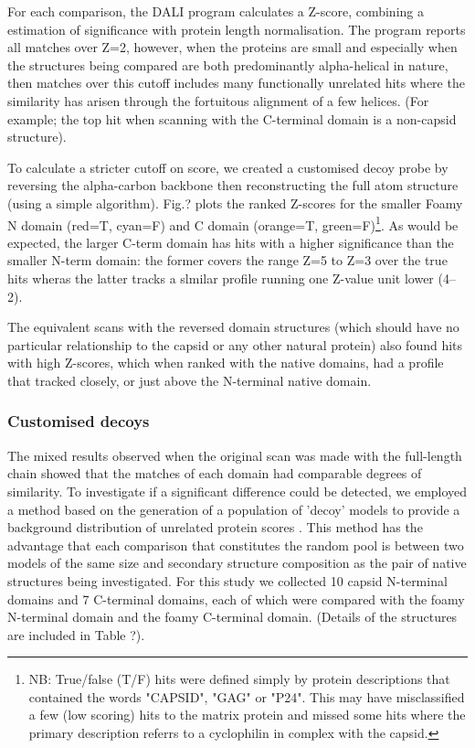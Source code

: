 For each comparison, the DALI program calculates a Z-score, combining a estimation of significance
with protein length normalisation.   The program reports all matches over Z=2, however, when the
proteins are small and especially when the structures being compared are both predominantly
alpha-helical in nature, then matches over this cutoff includes many functionally unrelated
hits where the similarity has arisen through the fortuitous alignment of a few helices.
(For example; the top hit when scanning with the C-terminal domain is a non-capsid structure).

To calculate a stricter cutoff on score, we created a customised decoy probe by reversing the
alpha-carbon backbone then reconstructing the full atom structure (using a simple algorithm).
Fig.? plots the ranked Z-scores for the smaller Foamy N domain (red=T, cyan=F) and C domain
(orange=T, green=F)\footnote{
NB: True/false (T/F) hits were defined simply by protein descriptions that contained the
words "CAPSID", "GAG" or "P24".   This may have misclassified a few (low scoring) hits to the matrix protein
and missed some hits where the primary description referrs to a cyclophilin in complex with the capsid. 
}.   As would be expected, the larger C-term domain has hits with a higher significance than the
smaller N-term domain:  the former covers the range Z=5 to Z=3 over the true hits wheras the
latter tracks a slmilar profile running one Z-value unit lower (4--2).

The equivalent scans with the reversed domain structures (which should have no particular
relationship to the capsid or any other natural protein) also found hits with high Z-scores,
which when ranked with the native domains, had a profile that tracked closely, or just above
the N-terminal native domain.
 

\subsubsection{Customised decoys}

The mixed results observed when the original scan was made with the full-length chain showed that
the matches of each domain had comparable degrees of similarity.    To investigate if a significant
difference could be detected, we employed a method based on the generation of a population of
'decoy' models to provide a background distribution of unrelated protein scores \cite{Taylor}.
This method has the advantage that each comparison that constitutes the random pool is between
two models of the same size and secondary structure composition as the pair of native structures
being investigated.
For this study we collected 10 capsid N-terminal domains and 7 C-terminal domains, each of which 
were compared with the foamy N-terminal domain and the foamy C-terminal domain.
(Details of the structures are included in Table ?).

